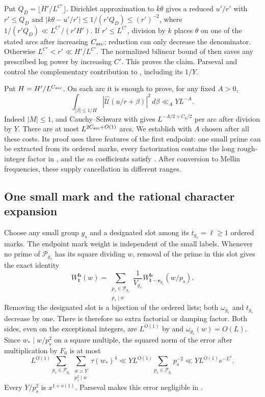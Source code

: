 Put $Q_D=\lfloor H'/L^{C'}\rfloor$. Dirichlet approximation to
$k\theta$ gives a reduced $u'/r'$ with $r'\leq Q_D$ and
$|k\theta-u'/r'|\leq1/(r'Q_D)\leq (r')^{-2}$, where
$1/(r'Q_D)\ll L^{C'}/(r'H')$.
If $r'\leq L^{C'}$, division by $k$ places $\theta$ on one of the
stated arcs after increasing $C_{\rm arc}$; reduction can only decrease
the denominator. Otherwise $L^{C'}<r'\ll H'/L^{C'}$.
The normalized bilinear bound of  then saves any
prescribed log power by increasing $C'$. This proves the claim.
Parseval and  control the complementary
contribution to , including its $1/Y$.

Put $H=H'/L^{C_{\rm arc}}$. On each arc it is enough to prove,
for any fixed $A>0$,
\begin{equation}\label{eq:local-energy-target}
 \int_{|\beta|\leq1/H}
       |\widehat{\mathcal U}(u/r+\beta)|^2\,d\beta
          \ll_A YL^{-A}.
\end{equation}
Indeed $|M|\leq1$, and Cauchy--Schwarz with
 gives $L^{-A/2+C_8/2}$ per arc after division
by $Y$. There are at most $L^{2C_{\rm arc}+O(1)}$ arcs. We establish
 with $A$ chosen after all these costs.
Its proof uses three features of the first endpoint: one small prime
can be extracted from its ordered marks, every factorization contains
the long rough-integer factor in , and the
$m$ coefficients satisfy . After conversion to
Mellin frequencies, these supply cancellation in different ranges.

\subsection{One small mark and the rational character expansion}

Choose any small group $g_s$ and a designated slot among its
$t_{g_s}=\ell\geq1$ ordered marks. The endpoint mark weight is
independent of the small labels. Whenever no prime of $\mathcal P_{g_s}$
has its square dividing $w$, removal of the prime in this slot gives
the exact identity
\begin{equation}\label{eq:small-mark-removal}
 W_{\mathbf t}^{\mathbf b}(w)=
 \sum_{\substack{p_s\in\mathcal P_{g_s}\\p_s\mid w}}
 \frac1{V_{g_s}}W_{\mathbf t-\mathbf e_{g_s}}^{\mathbf b}(w/p_s).
\end{equation}
Removing the designated slot is a bijection of the ordered lists;
both $\omega_{g_s}$ and $t_{g_s}$ decrease by one. There is therefore
no extra factorial or damping factor. Both sides, even on the
exceptional integers, are $L^{O(1)}$ by  and
$\omega_{g_s}(w)=O(L)$. Since
$w_*\mid w/p_s^2$ on a square multiple, the squared norm of the
error after multiplication by $F_0$ is at most
\[
 L^{O(1)}\sum_{p_s\in\mathcal P_{g_s}}
       \sum_{\substack{w\asymp Y\\p_s^2\mid w}}\tau(w_*)^4
 \ll YL^{O(1)}\sum_{p_s\in\mathcal P_{g_s}}p_s^{-2}
 \ll YL^{O(1)}e^{-L^a}.
\]
Every $Y/p_s^2$ is $x^{1+o(1)}$. Parseval makes this error negligible
in .

